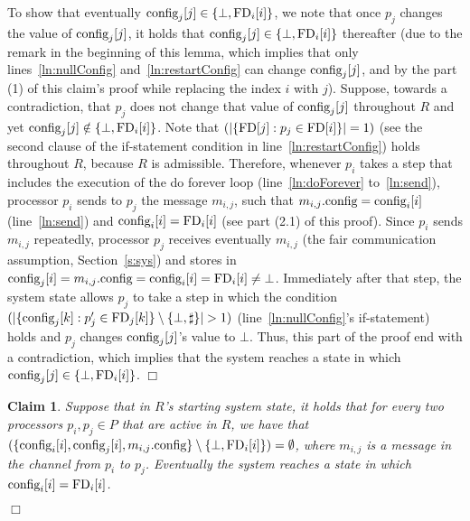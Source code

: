 \documentclass[11pt]{article}
\newtheorem{claim}[theorem]{Claim}
\newenvironment{proof}{\noindent{\bf Proof.}}{\hfill$\Box$}
\begin{document}
\begin{proof}
\begin{proof}
To show that eventually $\textnormal{config}_j[j] \in \{ \bot, \textnormal{FD}_i[i] \}$, we note that once $p_j$ changes the value of $\textnormal{config}_j[j]$, it holds that  $\textnormal{config}_j[j] \in \{ \bot, \textnormal{FD}_i[i] \}$ thereafter (due to the remark in the beginning of this lemma, which implies that only lines~\ref{ln:nullConfig} and~\ref{ln:restartConfig} can change $\textnormal{config}_j[j]$, and by the part (1) of this claim's proof while replacing the index $i$ with $j$). Suppose, towards a contradiction, that $p_j$ does not change that value of $\textnormal{config}_j[j]$ throughout $R$ and yet $\textnormal{config}_j[j] \notin \{ \bot, \textnormal{FD}_i[i] \}$. 
Note that $(| \{  \textnormal{FD}[j]: p_j \in \textnormal{FD}[i] \} | = 1)$ (see the second clause of the if-statement condition in line~\ref{ln:restartConfig}) holds throughout $R$, because $R$ is admissible. Therefore, whenever $p_i$ takes a step that includes the execution of the do forever loop (line~\ref{ln:doForever} to~\ref{ln:send}), processor $p_i$ sends to $p_j$ the message $m_{i,j}$, such that $m_{i,j}.\textnormal{config}=\textnormal{config}_i[i]$ (line~\ref{ln:send}) and $\textnormal{config}_i[i]=\textnormal{FD}_i[i]$ (see part (2.1) of this proof). Since $p_i$ sends $m_{i,j}$ repeatedly, processor $p_j$ receives eventually $m_{i,j}$ (the fair communication assumption, Section~\ref{s:sys}) and stores in $\textnormal{config}_j[i] = m_{i,j}.\textnormal{config} = \textnormal{config}_i[i] = \textnormal{FD}_i[i] \neq \bot$. Immediately after that step, the system state allows $p_j$ to take a step in which the condition 
$(|  \{ \textnormal{config}_j[k] : p_j' \in \textnormal{FD}_j[k] \}  \setminus \{ \bot, \sharp \} | > 1)$
(line~\ref{ln:nullConfig}'s if-statement) holds and $p_j$ changes $\textnormal{config}_j[j]$'s value to $\bot$. Thus, this part of the proof end with a contradiction, which implies that the system reaches a state in which $\textnormal{config}_j[j] \in \{ \bot, \textnormal{FD}_i[i] \}$.
\end{proof}


\begin{claim}
\label{thm:2Config}
Suppose that in $R$'s starting system state, it holds that for every two  processors $p_i, p_j \in P$ that are active in $R$, we have that $(\{ \textnormal{config}_i[i], \textnormal{config}_j[i], m_{i,j}.\textnormal{config} \} \setminus \{ \bot, \textnormal{FD}_i[i] \}) = \emptyset$, where $m_{i,j}$ is a message in the channel from $p_i$ to $p_j$. Eventually the system reaches a state in which $\textnormal{config}_i[i]=\textnormal{FD}_i[i]$.  
\end{claim} 


\end{proof}
\end{document}
